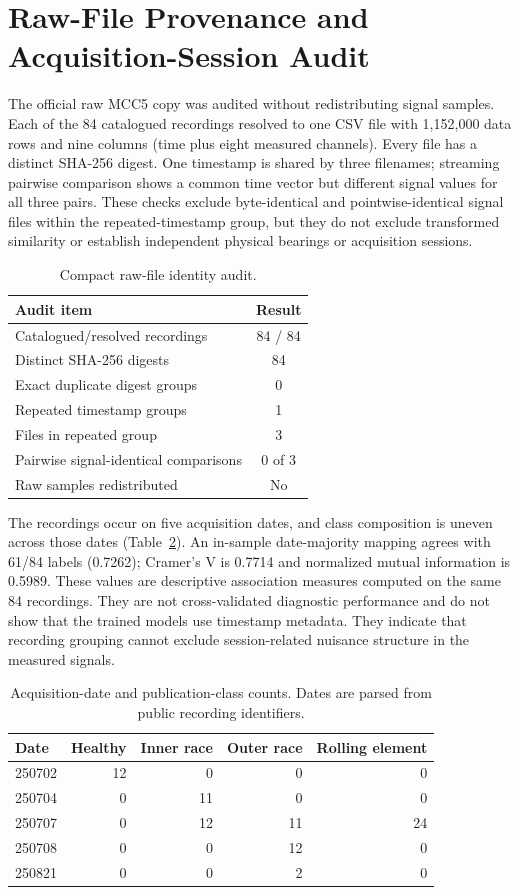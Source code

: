\documentclass[11pt]{article}
\begin{document}
\section{Raw-File Provenance and Acquisition-Session Audit}
The official raw MCC5 copy was audited without redistributing signal samples. Each of the 84 catalogued recordings resolved to one CSV file with 1,152,000 data rows and nine columns (time plus eight measured channels). Every file has a distinct SHA-256 digest. One timestamp is shared by three filenames; streaming pairwise comparison shows a common time vector but different signal values for all three pairs. These checks exclude byte-identical and pointwise-identical signal files within the repeated-timestamp group, but they do not exclude transformed similarity or establish independent physical bearings or acquisition sessions.

\begin{table}[H]
\centering
\caption{Compact raw-file identity audit.}
\label{tab:s_raw_integrity}
\small
\begin{tabular}{lc}
\toprule
Audit item & Result \\
\midrule
Catalogued/resolved recordings & 84 / 84 \\
Distinct SHA-256 digests & 84 \\
Exact duplicate digest groups & 0 \\
Repeated timestamp groups & 1 \\
Files in repeated group & 3 \\
Pairwise signal-identical comparisons & 0 of 3 \\
Raw samples redistributed & No \\
\bottomrule
\end{tabular}
\end{table}

The recordings occur on five acquisition dates, and class composition is uneven across those dates (Table~\ref{tab:s_date_class}). An in-sample date-majority mapping agrees with 61/84 labels (0.7262); Cramer's V is 0.7714 and normalized mutual information is 0.5989. These values are descriptive association measures computed on the same 84 recordings. They are not cross-validated diagnostic performance and do not show that the trained models use timestamp metadata. They indicate that recording grouping cannot exclude session-related nuisance structure in the measured signals.

\begin{table}[H]
\centering
\caption{Acquisition-date and publication-class counts. Dates are parsed from public recording identifiers.}
\label{tab:s_date_class}
\small
\begin{tabular}{lrrrr}
\toprule
Date & Healthy & Inner race & Outer race & Rolling element \\
\midrule
250702 & 12 & 0 & 0 & 0 \\
250704 & 0 & 11 & 0 & 0 \\
250707 & 0 & 12 & 11 & 24 \\
250708 & 0 & 0 & 12 & 0 \\
250821 & 0 & 0 & 2 & 0 \\
\bottomrule
\end{tabular}
\end{table}
\end{document}
